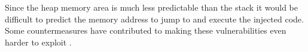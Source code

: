 
Since the heap memory area is much less predictable than the stack it would be difficult to predict the memory address to jump to and execute the injected code. Some countermeasures have contributed to making these vulnerabilities even harder to exploit \cite{Younan04codeinjection, Erlingsson:2007:LAD}. 


